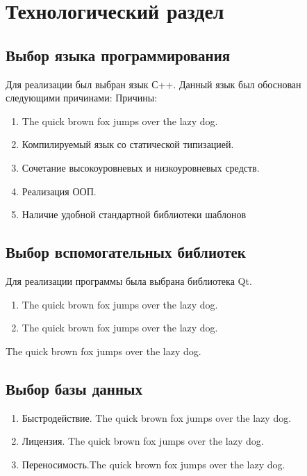 \chapter{Технологический раздел}
\section{Выбор  языка программирования}
Для реализации  был выбран язык  С++. Данный язык был обоснован следующими причинами:
Причины:
\begin{enumerate}
	 \item The quick brown fox jumps over the lazy dog.
	 \item Компилируемый язык со статической типизацией. 
	 \item Сочетание высокоуровневых и низкоуровневых средств.
	 \item Реализация ООП.
	 \item Наличие удобной стандартной библиотеки шаблонов
	 \end{enumerate}
\section{Выбор вспомогательных библиотек}
Для реализации программы была выбрана библиотека Qt.
\begin{enumerate}
	\item The quick brown fox jumps over the lazy dog.
	\item The quick brown fox jumps over the lazy dog.
\end{enumerate}
The quick brown fox jumps over the lazy dog.
\section{Выбор базы данных}

\begin{enumerate}
	\item Быстродействие. The quick brown fox jumps over the lazy dog.
	\item Лицензия. The quick brown fox jumps over the lazy dog.
	\item Переносимость.The quick brown fox jumps over the lazy dog.
\end{enumerate}




